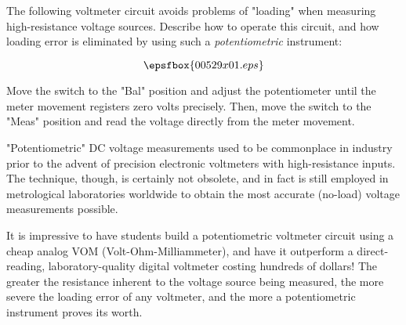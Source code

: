 

The following voltmeter circuit avoids problems of "loading" when measuring high-resistance voltage sources.  Describe how to operate this circuit, and how loading error is eliminated by using such a {\it potentiometric} instrument:

$$\epsfbox{00529x01.eps}$$







Move the switch to the "Bal" position and adjust the potentiometer until the meter movement registers zero volts precisely.  Then, move the switch to the "Meas" position and read the voltage directly from the meter movement.







"Potentiometric" DC voltage measurements used to be commonplace in industry prior to the advent of precision electronic voltmeters with high-resistance inputs.  The technique, though, is certainly not obsolete, and in fact is still employed in metrological laboratories worldwide to obtain the most accurate (no-load) voltage measurements possible.

It is impressive to have students build a potentiometric voltmeter circuit using a cheap analog VOM (Volt-Ohm-Milliammeter), and have it outperform a direct-reading, laboratory-quality digital voltmeter costing hundreds of dollars!  The greater the resistance inherent to the voltage source being measured, the more severe the loading error of any voltmeter, and the more a potentiometric instrument proves its worth. 



